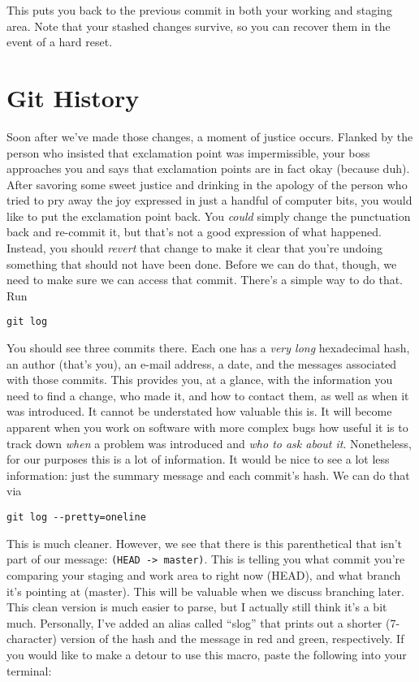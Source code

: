 \par{
This puts you back to the previous commit in both your working and staging
area. Note that your stashed changes survive, so you can recover them in the
event of a hard reset.
}

\section{Git History}
\par{
Soon after we've made those changes, a moment of justice occurs. Flanked by the
person who insisted that exclamation point was impermissible, your boss
approaches you and says that exclamation points are in fact okay (because
duh). After savoring some sweet justice and drinking in the apology of the
person who tried to pry away the joy expressed in just a handful of computer
bits, you would like to put the exclamation point back. You \emph{could}
simply change the punctuation back and re-commit it, but that's not a good
expression of what happened. Instead, you should \emph{revert} that change to
make it clear that you're undoing something that should not have been done.
Before we can do that, though, we need to make sure we can access that commit.
There's a simple way to do that. Run
}

\begin{verbatim}
git log
\end{verbatim}

\par{
You should see three commits there. Each one has a \emph{very long}
hexadecimal hash, an author (that's you), an e-mail address, a date, and the
messages associated with those commits. This provides you, at a glance, with
the information you need to find a change, who made it, and how to contact
them, as well as when it was introduced. It cannot be understated how valuable
this is. It will become apparent when you work on software with more complex
bugs how useful it is to track down \emph{when} a problem was introduced and 
\emph{who to ask about it}. Nonetheless, for our purposes this is a lot of
information. It would be nice to see a lot less information: just the summary
message and each commit's hash. We can do that via
}

\begin{verbatim}
git log --pretty=oneline
\end{verbatim}

\par{
This is much cleaner. However, we see that there is this parenthetical that
isn't part of our message: \verb+(HEAD -> master)+. This is telling you what
commit you're comparing your staging and work area to right now (HEAD), and
what branch it's pointing at (master). This will be valuable when we discuss
branching later. This clean version is much easier to parse, but I actually
still think it's a bit much. Personally, I've added an alias called ``slog''
that prints out a shorter (7-character) version of the hash and the message in
red and green, respectively. If you would like to make a detour to use this
macro, paste the following into your terminal:
}

